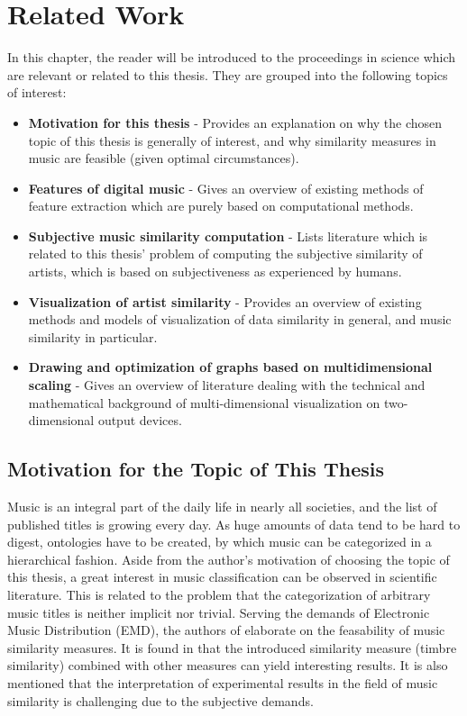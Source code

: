 \section{Related Work}

In this chapter, the reader will be introduced to the proceedings in science which are
relevant or related to this thesis. They are grouped into the following topics of interest:

\begin{itemize}
	\item \textbf {Motivation for this thesis} - Provides an explanation on why the chosen 
		  topic of this thesis is generally of interest, and why similarity measures in music are feasible
		  (given optimal circumstances).
	\item \textbf {Features of digital music} - Gives an overview of existing methods of 
		  feature extraction which are purely based on computational methods.
	\item \textbf {Subjective music similarity computation} - Lists literature which is related
		  to this thesis' problem of computing the subjective similarity of artists, which is
		  based on subjectiveness as experienced by humans.
	\item \textbf {Visualization of artist similarity} - Provides an overview of existing 
		  methods and models of visualization of data similarity in general, and music similarity
		  in particular.
	\item \textbf {Drawing and optimization of graphs based on multidimensional scaling} - Gives an
		  overview of literature dealing with the technical and mathematical background of 
		  multi-dimensional visualization on two-dimensional output devices.
\end{itemize}

\subsection{Motivation for the Topic of This Thesis}

Music is an integral part of the daily life in nearly all societies, and the list of published titles 
is growing every day. As huge amounts of data tend to be hard to digest, ontologies have to be created, 
by which music can be categorized in a hierarchical fashion. Aside from the author's motivation of 
choosing the topic of this thesis, a great interest in music classification can be observed in scientific 
literature. This is related to the problem that the categorization of arbitrary music titles
is neither implicit nor trivial.
Serving the demands of Electronic Music Distribution (EMD), the authors of \cite{pachet:02g} elaborate
on the feasability of music similarity measures. It is found in \cite{pachet:02g} that the introduced
similarity measure (timbre similarity) combined with other measures can yield interesting results. It is
also mentioned that the interpretation of experimental results in the field of music similarity is challenging
due to the subjective demands. 

